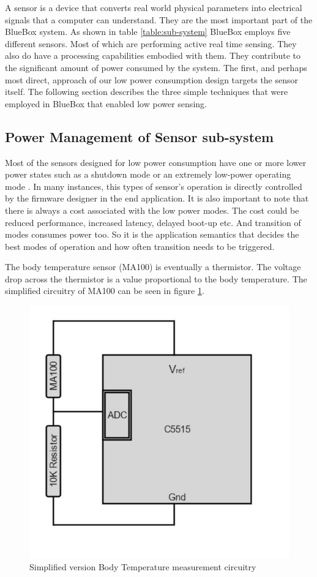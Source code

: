  A sensor is a device that converts real world physical parameters into electrical signals that a computer can understand.  They are the most important part of the BlueBox system. As shown in table \ref{table:sub-system} BlueBox employs five different sensors. Most of which are performing active real time sensing. They also do have a processing capabilities embodied with them. They contribute to the significant amount of power consumed by the system.  
 The first, and perhaps most direct, approach of our low power consumption design targets the sensor itself. The following section describes the three simple techniques that were employed in BlueBox that enabled low power sensing.
 \subsection{Power Management of Sensor sub-system}
   Most of the sensors designed for low power consumption have one or more lower power states such as a shutdown mode or an extremely low-power operating mode \cite{}. In many instances, this types of sensor's operation is directly controlled by  the firmware designer in the end application. It is also important to note that there is always a cost associated with the low power modes. The cost could be reduced performance, increased latency, delayed boot-up etc. And transition of modes consumes power too. So it is the application semantics that decides the best modes of operation and how often transition needs to be triggered. 
 
 
 The body temperature sensor (MA100) is eventually a thermistor. The voltage drop across the thermistor is a value proportional to the body temperature. The simplified circuitry of MA100 can be seen in figure \ref{body_temp}.
 \begin{figure}[h]
 	\centering
 	\includegraphics[scale = 0.5 ]{body_temp.JPG}
 	\caption{Simplified version Body Temperature measurement circuitry\label{body_temp}}
 \end{figure}
 
